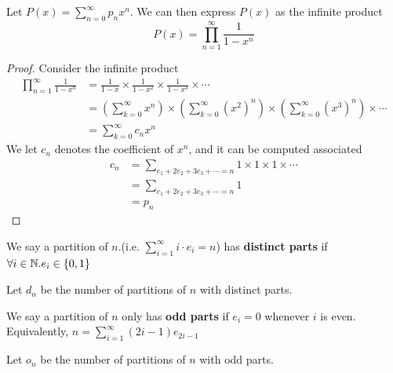 \begin{theorem}
    Let $P(x)=\sum_{n=0}^{\infty}p_nx^n$. 
    We can then express $P(x)$ as the infinite product $$P(x)=\prod_{n=1}^{\infty}\frac{1}{1-x^n}$$
\end{theorem}
\begin{proof}
    Consider the infinite product 
    \begin{equation}
        \begin{split}
            \prod_{n=1}^{\infty}\frac{1}{1-x^n} &= \frac{1}{1-x} \times \frac{1}{1-x^2} \times \frac{1}{1-x^3} \times \cdots\\
            &= (\sum_{k=0}^{\infty}x^n)\times(\sum_{k=0}^{\infty}(x^2)^n)\times(\sum_{k=0}^{\infty}(x^3)^n) \times \cdots\\
            &= \sum_{k=0}^{\infty}c_nx^n
        \end{split}
    \end{equation}
    We let  $c_n$ denotes the coefficient of $x^n$, and it can be computed associated
    \begin{equation}
        \begin{split}
            c_n &= \sum_{e_1+2e_2+3e_3+ \cdots =n}1 \times 1 \times 1 \times \cdots\\
            &= \sum_{e_1+2e_2+3e_3+ \cdots =n}1\\
            &= p_n
        \end{split}
    \end{equation}
\end{proof}

\begin{definition}
    We say a partition of $n$.(i.e. $\sum_{i=1}^{\infty}i \cdot e_i=n$) has \textbf{distinct parts} if $\forall i \in \mathbb{N}.e_i \in \{0,1\}$
\end{definition}

\begin{definition}
    Let $d_n$ be the number of partitions of $n$ with distinct parts.
\end{definition}

\begin{definition}
    We say a partition of $n$ only has \textbf{odd parts} if $e_i=0$ whenever $i$ is even. Equivalently, $n=\sum_{i=1}^{\infty}(2i-1)e_{2i-1}$
\end{definition}

\begin{definition}
    Let $o_n$ be the number of partitions of $n$ with odd parts.
\end{definition}

